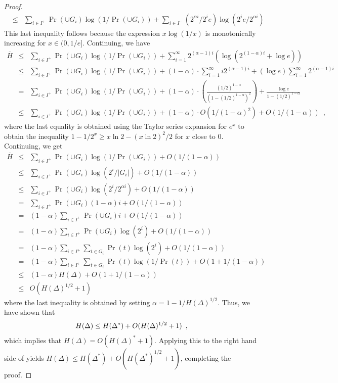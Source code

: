 \documentclass[acmtalg]{acmsmall}
\begin{document}
\begin{proof}
\begin{eqnarray*}
 & \le & \sum_{i\in I^+}\Pr(\cup G_{i})\log(1/\Pr(\cup G_{i})) 
         + \sum_{i\in I^-}(2^{\alpha i}/2^{i}e)\log(2^{i}e/2^{\alpha i}) 
\end{eqnarray*}
This last inequality follows because the expression $x\log (1/x)$ is
monotonically increasing for $x\in(0,1/e]$.  Continuing, we have
\begin{eqnarray*}
\overline H
   & \le & \sum_{i\in I^+}\Pr(\cup G_{i})\log(1/\Pr(\cup G_{i})) 
         + \sum_{i=1}^\infty 2^{(\alpha-1)i}(\log(2^{(1-\alpha)i}+\log e)) \\
 &  \le  & \sum_{i\in I^+}\Pr(\cup G_{i})\log(1/\Pr(\cup G_{i})) 
         + (1-\alpha)\cdot\sum_{i=1}^\infty i2^{(\alpha-1)i}
         + (\log e) \sum_{i=1}^\infty 2^{(\alpha-1)i} \\
 &  =  & \sum_{i\in I^+}\Pr(\cup G_{i})\log(1/\Pr(\cup G_{i})) 
         + (1-\alpha)\cdot\left(\frac{(1/2)^{1-\alpha}}{(1-(1/2)^{1-\alpha})^2}\right) 
         + \frac{\log e}{1-(1/2)^{1-\alpha}} \\
 & \le & \sum_{i\in I^+}\Pr(\cup G_{i})\log(1/\Pr(\cup G_{i})) 
         + (1-\alpha)\cdot O(1/(1-\alpha)^2) 
         + O(1/(1-\alpha)) \enspace ,
\end{eqnarray*}
where the last equality is obtained using the Taylor series expansion
for $e^{x}$ to obtain the inequality $1-1/2^{x} \ge x\ln 2 - (x\ln 2)^2/2$
for $x$ close to 0.  Continuing, we get 
\begin{eqnarray*}
\overline H
  & \le & \sum_{i\in I^+}\Pr(\cup G_{i})\log(1/\Pr(\cup G_{i})) 
         + O(1/(1-\alpha)) \\
  & \le & \sum_{i\in I^+}\Pr(\cup G_{i})\log(2^i/|G_i|)
         + O(1/(1-\alpha)) \\
  & \le & \sum_{i\in I^+}\Pr(\cup G_{i})\log(2^i/2^{\alpha i})
         + O(1/(1-\alpha)) \\
  &  =  & \sum_{i\in I^+}\Pr(\cup G_{i})(1-\alpha) i
         + O(1/(1-\alpha)) \\
  &  =  & (1-\alpha)\sum_{i\in I^+}\Pr(\cup G_{i}) i
         + O(1/(1-\alpha)) \\
  &  =  & (1-\alpha)\sum_{i\in I^+}\Pr(\cup G_{i})\log(2^i)
         + O(1/(1-\alpha)) \\
  &  =  & (1-\alpha)\sum_{i\in I^+}\sum_{t\in G_i}\Pr(t)\log(2^i)
         + O(1/(1-\alpha)) \\
  &  =  & (1-\alpha)\sum_{i\in I^+}\sum_{t\in G_i}\Pr(t)\log(1/\Pr(t))
         + O(1+1/(1-\alpha)) \\
  & \le & (1-\alpha)H(\Delta) + O(1+1/(1-\alpha)) \\
  & \le &  O(H(\Delta)^{1/2}+ 1)
\end{eqnarray*} 
where the last inequality is obtained by setting 
$\alpha=1-1/H(\Delta)^{1/2}$.  Thus, we have shown that
\begin{equation}
  H(\Delta) \le H(\Delta^*) + O(H(\Delta)^{1/2}+1) \enspace ,
   \eqlabelx{almost-last}
\end{equation}
which implies that $H(\Delta) = O(H(\Delta)^*+1)$.  Applying this to
the right hand side of  yields $H(\Delta) \le
H(\Delta^*) + O(H(\Delta^*)^{1/2} + 1)$, completing the proof.
\end{proof}
\end{document}
